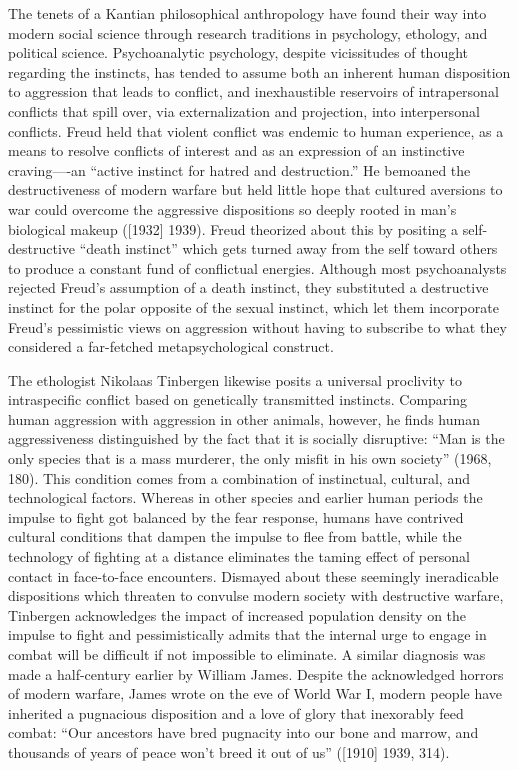 The tenets of a Kantian philosophical anthropology have found their way into modern social science through research traditions in psychology, ethology, and political science. Psychoanalytic psychology, despite vicissitudes of thought regarding the instincts, has tended to assume both an inherent human disposition to aggression that leads to conflict, and inexhaustible reservoirs of intrapersonal conflicts that spill over, via externalization and projection, into interpersonal conflicts. Freud held that violent conflict was endemic to human experience, as a means to resolve conflicts of interest and as an expression of an instinctive craving----an ``active instinct for hatred and destruction.'' He bemoaned the destructiveness of modern warfare but held little hope that cultured aversions to war could overcome the aggressive dispositions so deeply rooted in man's biological makeup ([1932] 1939). Freud theorized about this by positing a self-destructive ``death instinct'' which gets turned away from the self toward others to produce a constant fund of conflictual energies. Although most psychoanalysts rejected Freud's assumption of a death instinct, they substituted a destructive instinct for the polar opposite of the sexual instinct, which let them incorporate Freud's pessimistic views on aggression without having to subscribe to what they considered a far-fetched metapsychological construct. 

The ethologist Nikolaas Tinbergen likewise posits a universal proclivity to intraspecific conflict based on genetically transmitted instincts. Comparing human aggression with aggression in other animals, however, he finds human aggressiveness distinguished by the fact that it is socially disruptive: ``Man is the only species that is a mass murderer, the only misfit in his own society'' (1968, 180). This condition comes from a combination of instinctual, cultural, and technological factors. Whereas in other species and earlier human periods the impulse to fight got balanced by the fear response, humans have contrived cultural conditions that dampen the impulse to flee from battle, while the technology of fighting at a distance eliminates the taming effect of personal contact in face-to-face encounters. Dismayed about these seemingly ineradicable dispositions which threaten to convulse modern society with destructive warfare, Tinbergen acknowledges the impact of increased population density on the impulse to fight and pessimistically admits that the internal urge to engage in combat will be difficult if not impossible to eliminate. A similar diagnosis was made a half-century earlier by William James. Despite the acknowledged horrors of modern warfare, James wrote on the eve of World War I, modern people have inherited a pugnacious disposition and a love of glory that inexorably feed combat: ``Our ancestors have bred pugnacity into our bone and marrow, and thousands of years of peace won't breed it out of us'' ([1910] 1939, 314). 

